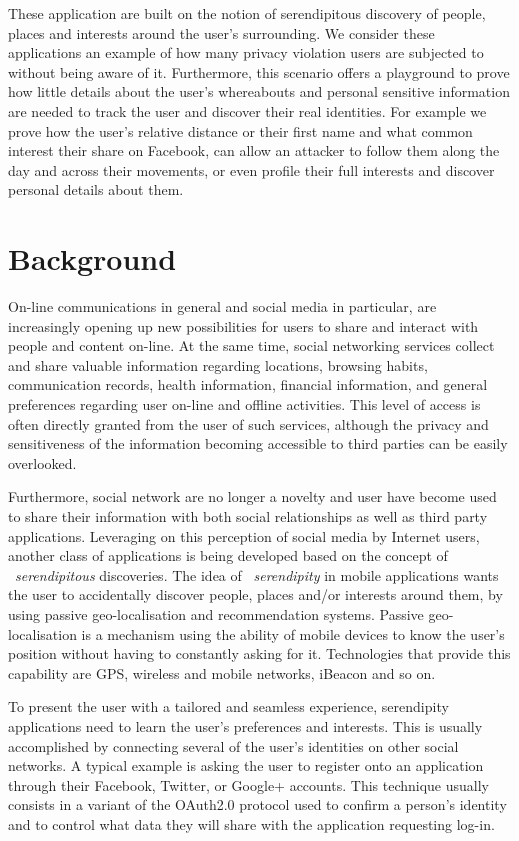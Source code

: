 These application are built on the notion of serendipitous discovery of people, places and interests around the user's surrounding.  We consider these applications an example of how many privacy violation users are subjected to without being aware of it. Furthermore, this scenario offers a playground to prove how little details about the user's whereabouts and personal sensitive information are needed to track the user and discover their real identities.  For example we prove how the user's relative distance or their first name and what common interest their share on Facebook, can allow an attacker to follow them along the day and across their movements, or even profile their full interests and discover personal details about them.

\section{Background}

On-line communications in general and social media in particular, are increasingly opening up new possibilities for users to share and interact with people and content on-line. At the same time, social networking services collect and share valuable information regarding locations, browsing habits, communication records, health information, financial information, and general preferences regarding user on-line and offline activities. This level of access is often directly granted from the user of such services, although the privacy and sensitiveness of the information becoming accessible to third parties can be easily overlooked.

Furthermore, social network are no longer a novelty and user have become used to share their information with both social relationships as well as third party applications. Leveraging on this perception of social media by Internet users, another class of applications is being developed based on the concept of ~\emph{serendipitous} discoveries. The idea of ~\emph{serendipity} in mobile applications wants the user to accidentally discover people, places and/or interests around them, by using passive geo-localisation and recommendation systems. Passive geo-localisation is a mechanism using the ability of mobile devices to know the user's position without having to constantly asking for it. Technologies that provide this capability are GPS, wireless and mobile networks, iBeacon and so on.

To present the user with a tailored and seamless experience, serendipity applications need to learn the user's preferences and interests. This is usually accomplished by connecting several of the user's identities on other social networks. A typical example is asking the user to register onto an application through their Facebook, Twitter, or Google+ accounts. This technique usually consists in a variant of the OAuth2.0 protocol used to confirm a person's identity and to control what data they will share with the application requesting log-in.

